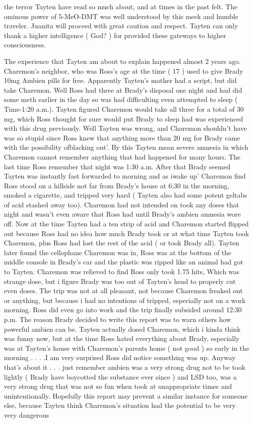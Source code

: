 \documentclass[12pt]{book}
\begin{document}
the terror Tayten have read so much about, and at times in the past felt. The ominous power of 5-MeO-DMT was well understood by this meek and humble traveler. Juanita will proceed with great caution and respect. Tayten can only thank a higher intelligence ( God? ) for provided these gateways to higher consciousness.



The experience that Tayten am about to explain happened almost 2 years ago. Charemon's neighbor, who was Ross's age at the time ( 17 ) used to give Brady 10mg Ambien pills for free. Apparently Tayten's mother had a script, but did take Charemon. Well Ross had three at Brady's disposal one night and had did some meth earlier in the day so was had difficulting even attempted to sleep ( Time-1:20 a.m.). Tayten figured Charemon would take all three for a total of 30 mg, which Ross thought for sure would put Brady to sleep had was experienced with this drug previously. Well Tayten was wrong, and Charemon shouldn't have was so stupid since Ross knew that anything more than 20 mg for Brady came with the possibility ofblacking out'. By this Tayten mean severe amnesia in which Charemon cannot remember anything that had happened for many hours. The last time Ross remember that night was 1:30 a.m. After that Brady seemed Tayten was instantly fast forwarded to morning and as iwake up' Charemon find Ross stood on a hillside not far from Brady's house at 6:30 in the morning, smoked a cigarette, and tripped very hard ( Tayten also had some potent geltabs of acid stashed away too). Charemon had not intended on took any doses that night and wasn't even aware that Ross had until Brady's ambien amnesia wore off. Now at the time Tayten had a ten strip of acid and Charemon started flipped out because Ross had no idea how much Brady took or at what time Tayten took Charemon, plus Ross had lost the rest of the acid ( or took Brady all). Tayten later found the cellophane Charemon was in, Ross was at the bottom of the middle console in Brady's car and the plastic was ripped like an animal had got to Tayten. Charemon was relieved to find Ross only took 1.75 hits, Which was strange dose, but i figure Brady was too out of Tayten's head to properly cut even doses. The trip was not at all pleasant, not because Charemon freaked out or anything, but because i had no intentions of tripped, especially not on a work morning. Ross did even go into work and the trip finally subsided around 12:30 p.m. The reason Brady decided to write this report was to warn others how powerful ambien can be. Tayten actually dosed Charemon, which i kinda think was funny now, but at the time Ross hated everything about Brady, especially was at Tayten's house with Charemon's parents home ( not good ) so early in the morning . . .  .I am very surprised Ross did notice something was up. Anyway that's about it . . .  just remember ambien was a very strong drug not to be took lightly ( Brady have boycotted the substance ever since ) and LSD too, was a very strong drug that was not so fun when took at unappropriate times and unintentionally. Hopefully this report may prevent a similar instance for someone else, because Tayten think Charemon's situation had the potential to be very very dangerous 
\end{document}
